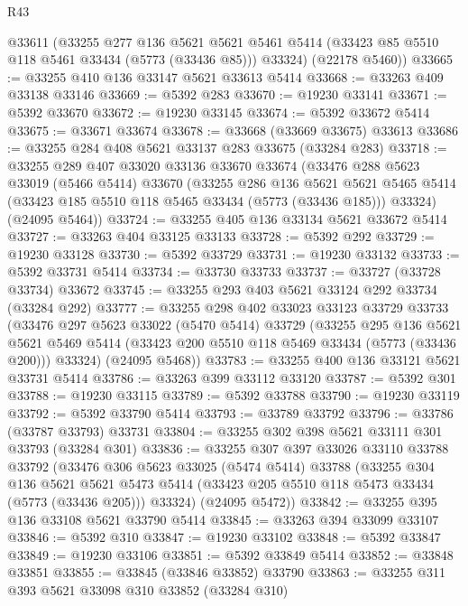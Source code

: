 \begin{lexlean}{R43}
\begin{coremodule}
      @33611
      (@33255
        @277
        @136
        @5621
        @5621
        @5461
        @5414
        (@33423 @85 @5510 @118 @5461 @33434 (@5773 (@33436 @85)))
        @33324)
      (@22178 @5460))
@33665 := @33255 @410 @136 @33147 @5621 @33613 @5414
@33668 := @33263 @409 @33138 @33146
@33669 := @5392 @283
@33670 := @19230 @33141
@33671 := @5392 @33670
@33672 := @19230 @33145
@33674 := @5392 @33672 @5414
@33675 := @33671 @33674
@33678 := @33668 (@33669 @33675) @33613
@33686 := @33255 @284 @408 @5621 @33137 @283 @33675 (@33284 @283)
@33718 := @33255
    @289
    @407
    @33020
    @33136
    @33670
    @33674
    (@33476
      @288
      @5623
      @33019
      (@5466 @5414)
      @33670
      (@33255
        @286
        @136
        @5621
        @5621
        @5465
        @5414
        (@33423 @185 @5510 @118 @5465 @33434 (@5773 (@33436 @185)))
        @33324)
      (@24095 @5464))
@33724 := @33255 @405 @136 @33134 @5621 @33672 @5414
@33727 := @33263 @404 @33125 @33133
@33728 := @5392 @292
@33729 := @19230 @33128
@33730 := @5392 @33729
@33731 := @19230 @33132
@33733 := @5392 @33731 @5414
@33734 := @33730 @33733
@33737 := @33727 (@33728 @33734) @33672
@33745 := @33255 @293 @403 @5621 @33124 @292 @33734 (@33284 @292)
@33777 := @33255
    @298
    @402
    @33023
    @33123
    @33729
    @33733
    (@33476
      @297
      @5623
      @33022
      (@5470 @5414)
      @33729
      (@33255
        @295
        @136
        @5621
        @5621
        @5469
        @5414
        (@33423 @200 @5510 @118 @5469 @33434 (@5773 (@33436 @200)))
        @33324)
      (@24095 @5468))
@33783 := @33255 @400 @136 @33121 @5621 @33731 @5414
@33786 := @33263 @399 @33112 @33120
@33787 := @5392 @301
@33788 := @19230 @33115
@33789 := @5392 @33788
@33790 := @19230 @33119
@33792 := @5392 @33790 @5414
@33793 := @33789 @33792
@33796 := @33786 (@33787 @33793) @33731
@33804 := @33255 @302 @398 @5621 @33111 @301 @33793 (@33284 @301)
@33836 := @33255
    @307
    @397
    @33026
    @33110
    @33788
    @33792
    (@33476
      @306
      @5623
      @33025
      (@5474 @5414)
      @33788
      (@33255
        @304
        @136
        @5621
        @5621
        @5473
        @5414
        (@33423 @205 @5510 @118 @5473 @33434 (@5773 (@33436 @205)))
        @33324)
      (@24095 @5472))
@33842 := @33255 @395 @136 @33108 @5621 @33790 @5414
@33845 := @33263 @394 @33099 @33107
@33846 := @5392 @310
@33847 := @19230 @33102
@33848 := @5392 @33847
@33849 := @19230 @33106
@33851 := @5392 @33849 @5414
@33852 := @33848 @33851
@33855 := @33845 (@33846 @33852) @33790
@33863 := @33255 @311 @393 @5621 @33098 @310 @33852 (@33284 @310)

\end{coremodule}
\end{lexlean}
